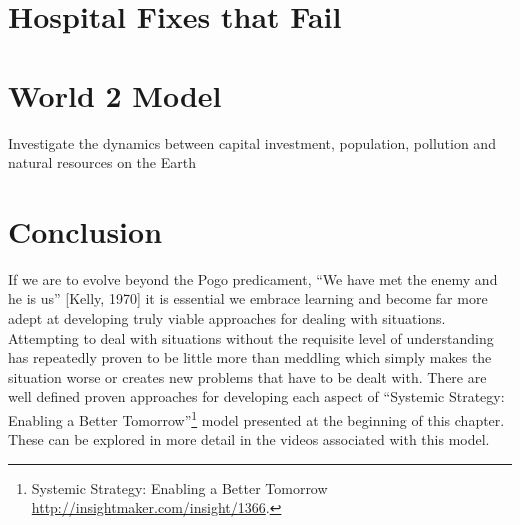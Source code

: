 \documentclass[]{memoir}
\begin{document}
\FloatBarrier 

\begin{model}[frametitle={Model: Innovation Diffusion}] 

 


 \end{model}

\section{Hospital Fixes that Fail}

\FloatBarrier 

\begin{model}[frametitle={Model}] 

 \end{model}

\section{World 2 Model}

\FloatBarrier 

\begin{model}[frametitle={Model: World 2 Model}] 

 Investigate the dynamics between capital investment, population, pollution and natural resources on the Earth




 \end{model}

\section{Conclusion}

If we are to evolve beyond the Pogo predicament, ``We have met the enemy
and he is us'' {[}Kelly, 1970{]} it is essential we embrace learning and
become far more adept at developing truly viable approaches for dealing
with situations. Attempting to deal with situations without the
requisite level of understanding has repeatedly proven to be little more
than meddling which simply makes the situation worse or creates new
problems that have to be dealt with. There are well defined proven
approaches for developing each aspect of ``Systemic Strategy: Enabling a
Better Tomorrow''\footnote{Systemic Strategy: Enabling a Better Tomorrow
  \href{http://insightmaker.com/insight/9077}{http://insightmaker.com/insight/1366}.}
model presented at the beginning of this chapter. These can be explored
in more detail in the videos associated with this model.
\end{document}
